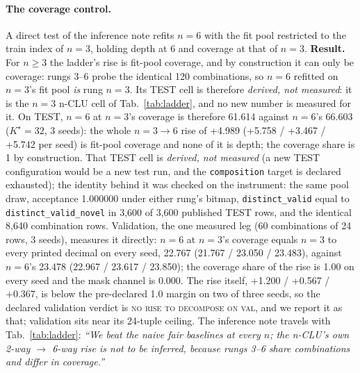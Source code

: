 \documentclass{article} %
\newcommand{\Kstar}{\ensuremath{K^{\star}}}
\begin{document}
\paragraph{The coverage control.} A direct test of the inference note refits $n=6$ with the
fit pool restricted to the train index of $n=3$, holding depth at 6 and coverage at that of $n=3$.
\textbf{Result.} For $n\ge3$ the ladder's rise is fit-pool
coverage, and by construction it can only be coverage: rungs 3--6 probe the identical 120 combinations, %
so $n=6$ refitted on $n=3$'s fit pool \emph{is} rung $n=3$. Its TEST cell is therefore
\emph{derived, not measured}: it is the $n=3$ n-CLU cell of Tab.~\ref{tab:ladder}, and no new
number is measured for it. %
On TEST, $n=6$ at $n=3$'s coverage is therefore 61.614 against $n=6$'s 66.603 ($\Kstar=32$, 3 seeds): %
the whole $n=3\to6$ rise of +4.989 (+5.758 / +3.467 / +5.742 per seed) is fit-pool coverage and %
none of it is depth; the coverage share is 1 by construction. That TEST cell is \emph{derived, not
measured} (a new TEST configuration would be a new test run, and the \texttt{composition} target is
declared exhausted); the identity behind it was checked on the instrument: the same pool draw,
acceptance 1.000000 under either rung's bitmap, \texttt{distinct\_valid} equal to %
\texttt{distinct\_valid\_novel} in 3,600 of 3,600 published TEST rows, and the identical 8,640 %
combination rows. Validation, the one measured leg (60 combinations of 24 rows, 3 seeds), measures it %
directly: $n=6$ at $n=3$'s coverage equals $n=3$ to every printed decimal on every seed, 22.767 %
(21.767 / 23.050 / 23.483), against $n=6$'s 23.478 (22.967 / 23.617 / 23.850); the coverage %
share of the rise is 1.00 on every seed and the mask channel is 0.000. The rise itself, %
+1.200 / +0.567 / +0.367, is below the pre-declared 1.0 margin on two of three seeds, so the %
declared validation verdict is \textsc{no rise to decompose on val}, and we report it as
that; validation sits near its 24-tuple ceiling. The inference note travels with %
Tab.~\ref{tab:ladder}: \emph{``We beat the naive fair baselines at every $n$; the n-CLU's own 2-way
$\to$ 6-way rise is not to be inferred, because rungs 3--6 share combinations and differ in coverage.''}
\end{document}
